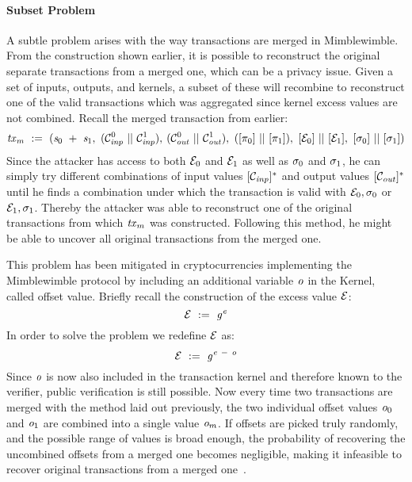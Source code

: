 \paragraph{Subset Problem} \label{par:pre:mimblewimble:subset}
A subtle problem arises with the way transactions are merged in Mimblewimble.
From the construction shown earlier, it is possible to reconstruct the original separate transactions from a merged one, which can be a privacy issue.
Given a set of inputs, outputs, and kernels, a subset of these will recombine to reconstruct one of the valid transactions which was aggregated since kernel excess values are not combined.
Recall the merged transaction from earlier:
\[ \mathit{tx}_m ~:=~ (\mathit{s}_0 ~+~ \mathit{s}_1 ,~ (\mathcal{C}_{\mathit{inp}}^0 ~||~ \mathcal{C}_{\mathit{inp}}^1),\:(\mathcal{C}_{\mathit{out}}^0 ~||~ \mathcal{C}_{\mathit{out}}^1) ,~ ([\pi_0] ~||~ [\pi_1]) ,~
[\mathcal{E}_0] ~||~ [\mathcal{E}_1] ,~ [\sigma_0] ~||~ [\sigma_1]) \]
Since the attacker has access to both $\mathcal{E}_0$ and $\mathcal{E}_1$ as well as $\sigma_0$ and $\sigma_1$, he can simply try different combinations of input values $[\mathcal{C}_{\mathit{inp}}]^*$ and output values $[\mathcal{C}_{\mathit{out}}]^*$ until he finds a combination under which the transaction is valid with $\mathcal{E}_0, \sigma_0$ or $\mathcal{E}_1, \sigma_1$.
Thereby the attacker was able to reconstruct one of the original transactions from which $\mathit{tx}_m$ was constructed.
Following this method, he might be able to uncover all original transactions from the merged one.

This problem has been mitigated in cryptocurrencies implementing the Mimblewimble protocol by including an additional variable $\mathit{o}$ in the Kernel, called offset value.
Briefly recall the construction of the excess value $\mathcal{E}$:
\[ \mathcal{E} ~:=~ \mathit{g}^{\mathit{e}} \]
In order to solve the problem we redefine $\mathcal{E}$ as:
\[ \mathcal{E} ~:=~ \mathit{g}^{\mathit{e} ~-~ \mathit{o}} \]
Since $\mathit{o}$ is now also included in the transaction kernel and therefore known to the verifier, public verification is still possible.
Now every time two transactions are merged with the method laid out previously, the two individual offset values $\mathit{o}_0$ and $\mathit{o}_1$ are combined into a single value $\mathit{o}_m$.
If offsets are picked truly randomly, and the possible range of values is broad enough, the probability of recovering the uncombined offsets from a merged one becomes negligible, making it infeasible to recover original transactions from a merged one~\cite{poelstra2016mimblewimble}.


